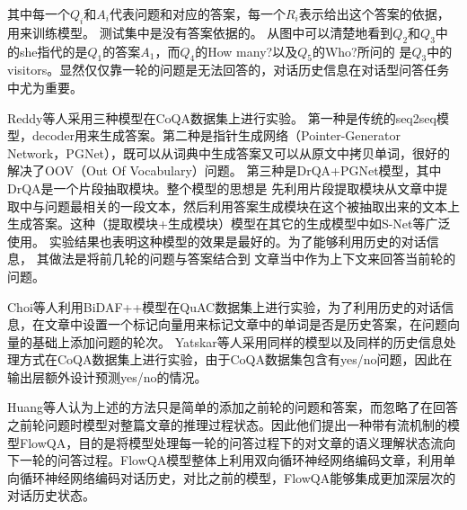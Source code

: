 其中每一个$Q_i$和$A_i$代表问题和对应的答案，每一个$R_i$表示给出这个答案的依据，用来训练模型。
测试集中是没有答案依据的。
从图中可以清楚地看到$Q_2$和$Q_3$中的she指代的是$Q_1$的答案$A_1$，而$Q_4$的How many?以及$Q_5$的Who?所问的
是$Q_3$中的visitors。显然仅仅靠一轮的问题是无法回答的，对话历史信息在对话型问答任务中尤为重要。

Reddy等人采用三种模型在CoQA数据集上进行实验。
第一种是传统的seq2seq模型，decoder用来生成答案。第二种是指针生成网络（Pointer-Generator Network，PGNet），既可以从词典中生成答案又可以从原文中拷贝单词，很好的解决了OOV（Out Of Vocabulary）问题。
第三种是DrQA+PGNet模型，其中DrQA是一个片段抽取模块。整个模型的思想是
先利用片段提取模块从文章中提取中与问题最相关的一段文本，然后利用答案生成模块在这个被抽取出来的文本上
生成答案。这种（提取模块+生成模块）模型在其它的生成模型中如S-Net等广泛使用。
实验结果也表明这种模型的效果是最好的。为了能够利用历史的对话信息，
其做法是将前几轮的问题与答案结合到
文章当中作为上下文来回答当前轮的问题。

Choi等人利用BiDAF++模型在QuAC数据集上进行实验，为了利用历史的对话信息，在文章中设置一个标记向量用来标记文章中的单词是否是历史答案，在问题向量的基础上添加问题的轮次。
Yatskar等人采用同样的模型以及同样的历史信息处理方式在CoQA数据集上进行实验，由于CoQA数据集包含有yes/no问题，因此在输出层额外设计预测yes/no的情况。

Huang等人认为上述的方法只是简单的添加之前轮的问题和答案，而忽略了在回答之前轮问题时模型对整篇文章的推理过程状态。因此他们提出一种带有流机制的模型FlowQA，目的是将模型处理每一轮的问答过程下的对文章的语义理解状态流向下一轮的问答过程。FlowQA模型整体上利用双向循环神经网络编码文章，利用单向循环神经网络编码对话历史，对比之前的模型，FlowQA能够集成更加深层次的对话历史状态。

